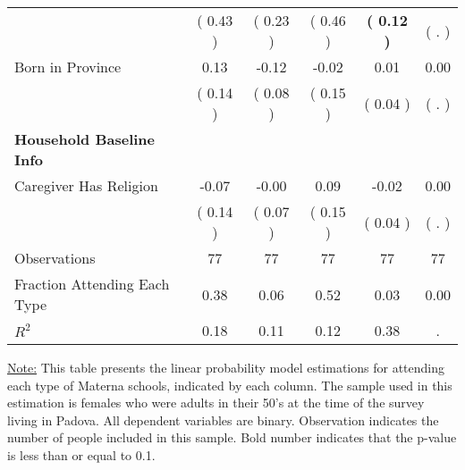 \begin{table}[H]
{\begin{tabular}{lccccc}
\quad  & (     0.43 ) & (     0.23 )  & (     0.46 )  & \textbf{(     0.12 )} & (        . ) \\
\quad Born in Province &      0.13 &     -0.12 &     -0.02 &      0.01 &      0.00 \\
\quad  & (     0.14 ) & (     0.08 )  & (     0.15 )  & (     0.04 ) & (        . ) \\
\midrule
\textbf{Household Baseline Info} \\
\quad Caregiver Has Religion &     -0.07 &     -0.00 &      0.09 &     -0.02 &      0.00 \\
\quad  & (     0.14 ) & (     0.07 )  & (     0.15 )  & (     0.04 ) & (        . ) \\
\midrule
Observations & 77 & 77 & 77 & 77 & 77 \\
Fraction Attending Each Type &      0.38 &      0.06 &      0.52 &      0.03 &      0.00 \\
\midrule
$ R^2$ &      0.18 &      0.11 &      0.12 &      0.38 &         . \\
\bottomrule
\end{tabular}}
\end{table}
\begin{footnotesize}
\noindent\underline{Note:} This table presents the linear probability model estimations for attending each type of Materna schools, indicated by each column. The sample used in this estimation is females who were adults in their 50's at the time of the survey living in Padova. All dependent variables are binary. Observation indicates the number of people included in this sample. Bold number indicates that the p-value is less than or equal to 0.1.
\end{footnotesize}
